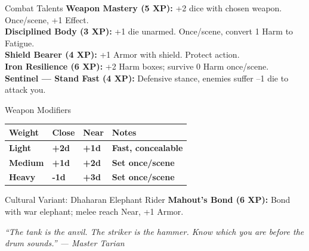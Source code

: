 \documentclass[10pt]{article}
\begin{document}
\begin{minipage}[t]{0.48\linewidth}
    \begin{charbox}{Combat Talents}
        \textbf{Weapon Mastery (5 XP):} +2 dice with chosen weapon. Once/scene, +1 Effect.\\
        \textbf{Disciplined Body (3 XP):} +1 die unarmed. Once/scene, convert 1 Harm to Fatigue.\\
        \textbf{Shield Bearer (4 XP):} +1 Armor with shield. Protect action.\\
        \textbf{Iron Resilience (6 XP):} +2 Harm boxes; survive 0 Harm once/scene.\\
        \textbf{Sentinel --- Stand Fast (4 XP):} Defensive stance, enemies suffer --1 die to attack you.
    \end{charbox}
    
    \vspace{0.5em}
    
    \begin{charbox}{Weapon Modifiers}
        \begin{tabular}{>{\bfseries}p{2cm} >{\bfseries}p{2cm} >{\bfseries}p{2cm} >{\bfseries}p{2cm}}
            \toprule
            \textbf{Weight} & \textbf{Close} & \textbf{Near} & \textbf{Notes} \\
            \midrule
            Light & +2d & +1d & Fast, concealable \\
            Medium & +1d & +2d & Set once/scene \\
            Heavy & -1d & +3d & Set once/scene \\
            \bottomrule
        \end{tabular}
    \end{charbox}
    
    \vspace{0.5em}
    
    \begin{charbox}{Cultural Variant: Dhaharan Elephant Rider}
        \textbf{Mahout's Bond (6 XP):} Bond with war elephant; melee reach Near, +1 Armor.
    \end{charbox}
\end{minipage}

\vspace{0.5em}
\begin{center}
    {\small\sffamily\itshape ``The tank is the anvil. The striker is the hammer. Know which you are before the drum sounds.'' --- Master Tarian}
\end{center}
\end{document}
